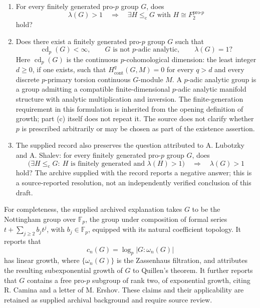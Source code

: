 \documentclass[11pt]{article}
\begin{document}
\begin{enumerate}
\item[(a)] For every finitely generated pro-\(p\) group \(G\), does
\[
\lambda(G)>1
\quad\Longrightarrow\quad
\exists H\leq_{\mathrm c}G\text{ with }H\cong F^{\mathrm{pro}\text{-}p}_2
\]
hold?

\item[(c)] Does there exist a finitely generated pro-\(p\) group \(G\) such that
\[
\operatorname{cd}_p(G)<\infty,\qquad
G\text{ is not }p\text{-adic analytic},\qquad
\lambda(G)=1?
\]
Here \(\operatorname{cd}_p(G)\) is the continuous \(p\)-cohomological dimension: the least integer \(d\geq0\), if one exists, such that \(H^q_{\mathrm{cont}}(G,M)=0\) for every \(q>d\) and every discrete \(p\)-primary torsion continuous \(G\)-module \(M\). A \(p\)-adic analytic group is a group admitting a compatible finite-dimensional \(p\)-adic analytic manifold structure with analytic multiplication and inversion. The finite-generation requirement in this formulation is inherited from the opening definition of growth; part (c) itself does not repeat it. The source does not clarify whether \(p\) is prescribed arbitrarily or may be chosen as part of the existence assertion.

\item[(b), archived.] The supplied record also preserves the question attributed to A. Lubotzky and A. Shalev: for every finitely generated pro-\(p\) group \(G\), does
\[
\bigl(\exists H\leq_{\mathrm c}G:\ H\text{ is finitely generated and }\lambda(H)>1\bigr)
\quad\Longrightarrow\quad\lambda(G)>1
\]
hold? The archive supplied with the record reports a negative answer; this is a source-reported resolution, not an independently verified conclusion of this draft.
\end{enumerate}

For completeness, the supplied archived explanation takes \(G\) to be the Nottingham group over \(\mathbb F_p\), the group under composition of formal series \(t+\sum_{j\geq2}b_jt^j\), with \(b_j\in\mathbb F_p\), equipped with its natural coefficient topology. It reports that
\[
c_n(G)=\log_p\lvert G:\omega_n(G)\rvert
\]
has linear growth, where \(\{\omega_n(G)\}\) is the Zassenhaus filtration, and attributes the resulting subexponential growth of \(G\) to Quillen's theorem. It further reports that \(G\) contains a free pro-\(p\) subgroup of rank two, of exponential growth, citing R. Camina and a letter of M. Ershov. These claims and their applicability are retained as supplied archival background and require source review.
\end{document}
